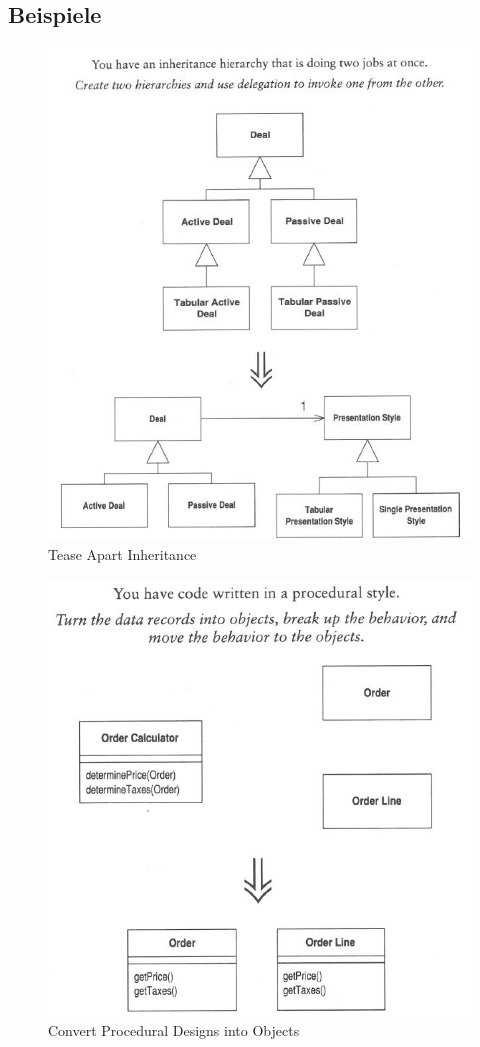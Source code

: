 \newpage

\subsection{Beispiele}

\begin{figure}[h!]
	\centering
	\includegraphics[width=0.7\linewidth]{fig/tease-apart-inheritance}
	\caption{Tease Apart Inheritance}
	\label{fig:tease-apart-inheritance}
\end{figure}

\begin{figure}[h!]
	\centering
	\includegraphics[width=0.7\linewidth]{fig/proc-to-object}
	\caption{Convert Procedural Designs into Objects}
	\label{fig:proc-to-object}
\end{figure}

